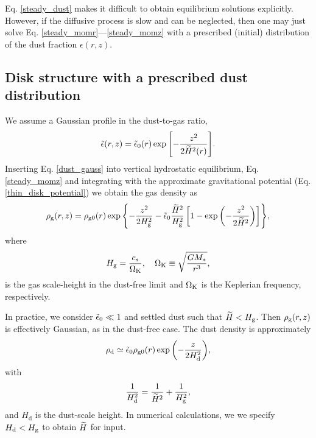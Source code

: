 Eq. \ref{steady_dust} makes it difficult to obtain equilibrium
solutions explicitly. However, if the diffusive process is slow and
can be neglected, then one may just solve
Eq. \ref{steady_momr}---\ref{steady_momz} with a prescribed (initial)
distribution of the dust fraction $\epsilon(r,z)$. 

\subsection{Disk structure with a prescribed dust distribution}\label{steady_state}  
We assume a Gaussian profile in the dust-to-gas ratio, 
\begin{align}\label{dust_gauss}
  \tilde{\epsilon}(r,z) = \tilde{\epsilon}_0(r)
  \exp{\left[-\frac{z^2}{2\widetilde{H}^2(r)}\right]}. 
\end{align}
Inserting Eq. \ref{dust_gauss} into vertical hydrostatic equilibrium,
Eq. \ref{steady_momz} and integrating with the approximate
gravitational potential (Eq. \ref{thin_disk_potential}) we obtain the
gas density as
\begin{align}
  \rho_\mathrm{g}(r,z) = \rho_\mathrm{g0}(r)\exp{\left\{ - \frac{z^2}{2H_\mathrm{g}^2}
    -\tilde{\epsilon}_0\frac{\widetilde{H}^2}{H_\mathrm{g}^2}\left[1 -
      \exp{\left(-\frac{z^2}{2\widetilde{H}^2}\right)}\right] \right\}}, 
\end{align}
where
\begin{align}
  H_\mathrm{g} = \frac{c_s}{\Omega_{\rm K}}, \quad \Omega_{\rm K} \equiv \sqrt{\frac{GM_*}{r^3}},   
\end{align}
is the gas scale-height in the dust-free limit and $\Omega_{\rm K}$ is the
Keplerian frequency, respectively. 

In practice, we consider $\tilde{\epsilon}_0 \ll 1$ and settled dust such that
$\widetilde{H}<H_\mathrm{g}$. Then $\rho_\mathrm{g}(r,z)$ is effectively Gaussian, as in the
dust-free case. The dust density is approximately 
\begin{align}
  \rho_\mathrm{d} \simeq \tilde{\epsilon}_0\rho_\mathrm{g0}(r) \exp
        {\left(-\frac{z}{2H_\mathrm{d}^2}\right)}, 
\end{align}
with 
\begin{align}
  \frac{1}{H_\mathrm{d}^2} = \frac{1}{\widetilde{H}^2} + \frac{1}{H_\mathrm{g}^2}, 
\end{align}
and $H_\mathrm{d}$ is the dust-scale height. In numerical
calculations, we  we specify $H_\mathrm{d}< H_\mathrm{g}$ to obtain 
$\widetilde{H}$ for input. 

